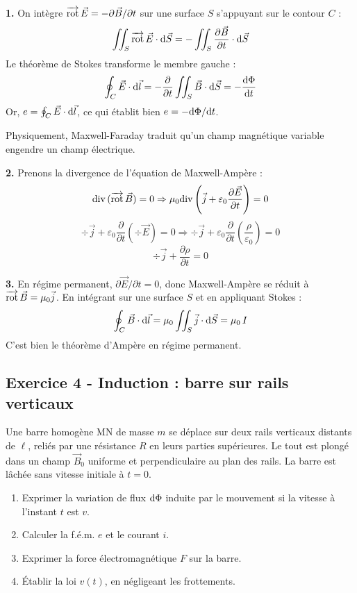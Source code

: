 \documentclass[12pt,a4paper]{article}
\begin{document}
\begin{boitecorrige}
\textbf{1.} On intègre $\overrightarrow{\mathrm{rot}}\,\vec{E} = -\partial\vec{B}/\partial t$ sur une surface $S$ s'appuyant sur le contour $C$ :
\[
\iint_S \overrightarrow{\mathrm{rot}}\,\vec{E}\cdot\mathrm{d}\vec{S} = -\iint_S \frac{\partial\vec{B}}{\partial t}\cdot\mathrm{d}\vec{S}
\]
Le théorème de Stokes transforme le membre gauche :
\[
\oint_C \vec{E}\cdot\mathrm{d}\vec{l} = -\frac{\partial}{\partial t}\iint_S \vec{B}\cdot\mathrm{d}\vec{S} = -\frac{\mathrm{d}\Phi}{\mathrm{d} t}
\]
Or, $e = \oint_C \vec{E}\cdot\mathrm{d}\vec{l}$, ce qui établit bien $e = -\mathrm{d}\Phi/\mathrm{d} t$.

Physiquement, Maxwell-Faraday traduit qu'un champ magnétique variable engendre un champ électrique.

\textbf{2.} Prenons la divergence de l'équation de Maxwell-Ampère :
\[
\mathrm{div}\,(\overrightarrow{\mathrm{rot}}\,\vec{B}) = 0 \Rightarrow \mu_0\mathrm{div}\,\!\left(\vec{j}+\varepsilon_0\frac{\partial\vec{E}}{\partial t}\right) = 0
\]
\[
\div\vec{j} + \varepsilon_0\frac{\partial}{\partial t}(\div\vec{E}) = 0 \Rightarrow \div\vec{j} + \varepsilon_0\frac{\partial}{\partial t}\!\left(\frac{\rho}{\varepsilon_0}\right) = 0
\]
\[
\boxed{\div\vec{j} + \frac{\partial\rho}{\partial t} = 0}
\]

\textbf{3.} En régime permanent, $\partial\vec{E}/\partial t = 0$, donc Maxwell-Ampère se réduit à $\overrightarrow{\mathrm{rot}}\,\vec{B} = \mu_0\vec{j}$. En intégrant sur une surface $S$ et en appliquant Stokes :
\[
\oint_C\vec{B}\cdot\mathrm{d}\vec{l} = \mu_0\iint_S\vec{j}\cdot\mathrm{d}\vec{S} = \mu_0\,I
\]
C'est bien le théorème d'Ampère en régime permanent.
\end{boitecorrige}

\subsection*{Exercice 4 - Induction : barre sur rails verticaux \niveau{\moyen}}

\begin{boiteexercice}
Une barre homogène MN de masse $m$ se déplace sur deux rails verticaux distants de $\ell$, reliés par une résistance $R$ en leurs parties supérieures. Le tout est plongé dans un champ $\vec{B}_0$ uniforme et perpendiculaire au plan des rails. La barre est lâchée sans vitesse initiale à $t=0$.

\begin{enumerate}
  \item Exprimer la variation de flux $\mathrm{d}\Phi$ induite par le mouvement si la vitesse à l'instant $t$ est $v$.
  \item Calculer la f.é.m. $e$ et le courant $i$.
  \item Exprimer la force électromagnétique $F$ sur la barre.
  \item Établir la loi $v(t)$, en négligeant les frottements.
\end{enumerate}
\end{boiteexercice}
\end{document}
